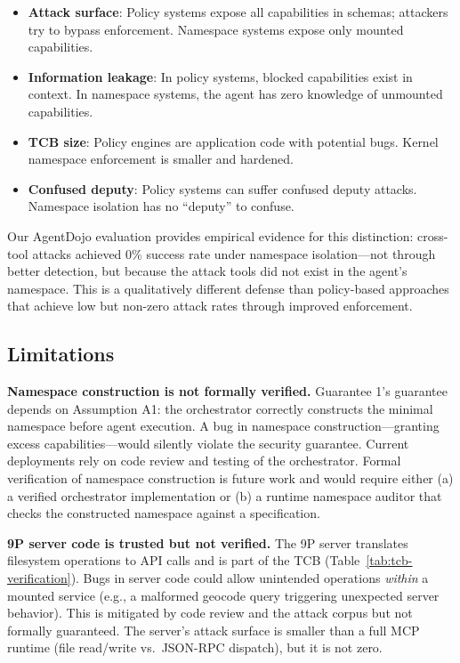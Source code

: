 \documentclass[acmsmall,screen,review]{acmart}
\begin{document}
\begin{itemize}
    \item \textbf{Attack surface}: Policy systems expose all capabilities in schemas; attackers try to bypass enforcement. Namespace systems expose only mounted capabilities.
    \item \textbf{Information leakage}: In policy systems, blocked capabilities exist in context. In namespace systems, the agent has zero knowledge of unmounted capabilities.
    \item \textbf{TCB size}: Policy engines are application code with potential bugs. Kernel namespace enforcement is smaller and hardened.
    \item \textbf{Confused deputy}: Policy systems can suffer confused deputy attacks. Namespace isolation has no ``deputy'' to confuse.
\end{itemize}

Our AgentDojo evaluation provides empirical evidence for this distinction: cross-tool attacks achieved 0\% success rate under namespace isolation---not through better detection, but because the attack tools did not exist in the agent's namespace. This is a qualitatively different defense than policy-based approaches that achieve low but non-zero attack rates through improved enforcement.

\subsection{Limitations}

\textbf{Namespace construction is not formally verified.} Guarantee 1's guarantee depends on Assumption A1: the orchestrator correctly constructs the minimal namespace before agent execution. A bug in namespace construction---granting excess capabilities---would silently violate the security guarantee. Current deployments rely on code review and testing of the orchestrator. Formal verification of namespace construction is future work and would require either (a) a verified orchestrator implementation or (b) a runtime namespace auditor that checks the constructed namespace against a specification.

\textbf{9P server code is trusted but not verified.} The 9P server translates filesystem operations to API calls and is part of the TCB (Table~\ref{tab:tcb-verification}). Bugs in server code could allow unintended operations \textit{within} a mounted service (e.g., a malformed geocode query triggering unexpected server behavior). This is mitigated by code review and the attack corpus but not formally guaranteed. The server's attack surface is smaller than a full MCP runtime (file read/write vs.\ JSON-RPC dispatch), but it is not zero.
\end{document}
